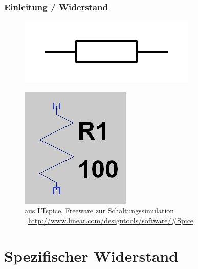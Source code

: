 \begin{frame}
    \frametitle{Einleitung / Widerstand}

    \begin{center}
           \begin{figure}
      \includegraphics[width=.3\textwidth,height=.3\textheight,keepaspectratio]{e04/Resistor_symbol_IEC.png}
    \end{figure}
    \end{center}

    \begin{center}
         \begin{figure}
      \includegraphics[width=.4\textwidth,height=.4\textheight,keepaspectratio]{e04/R_LTspice.png}
      \caption{aus LTspice, Freeware zur Schaltungssimulation \ExternalLink~\url{http://www.linear.com/designtools/software/\#Spice}}
    \end{figure}
    \end{center}
 	
\end{frame}



\section*{Spezifischer Widerstand}

